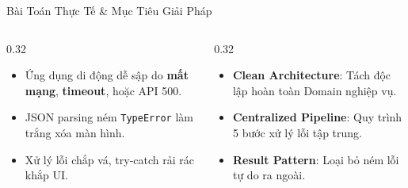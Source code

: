 \documentclass[aspectratio=169, 10pt]{beamer}
\newcommand{\speakerB}{\hfill\tcbox[colback=NavyPrimary,colframe=NavyPrimary,boxsep=1pt,left=3pt,right=3pt,top=1pt,bottom=1pt]{\tiny\bfseries\color{white}SV B: Phạm Nhung}}
\begin{document}
\begin{frame}{Bài Toán Thực Tế \& Mục Tiêu Giải Pháp \speakerB}
  \begin{columns}[T]
    \begin{column}{0.32\textwidth}
      \begin{tcolorbox}[colback=RoseDanger!5, colframe=RoseDanger, title=\textbf{1. Vấn đề thực tế}, arc=1.5mm, fonttitle=\scriptsize\bfseries]
        \begin{itemize}\setlength{\itemsep}{2pt}\scriptsize
          \item Ứng dụng di động dễ sập do \textbf{mất mạng}, \textbf{timeout}, hoặc API 500.
          \item JSON parsing ném \texttt{TypeError} làm trắng xóa màn hình.
          \item Xử lý lỗi chắp vá, try-catch rải rác khắp UI.
        \end{itemize}
      \end{tcolorbox}
    \end{column}

    \begin{column}{0.32\textwidth}
      \begin{tcolorbox}[colback=IndigoAccent!5, colframe=IndigoAccent, title=\textbf{2. Giải pháp kiến trúc}, arc=1.5mm, fonttitle=\scriptsize\bfseries]
        \begin{itemize}\setlength{\itemsep}{2pt}\scriptsize
          \item \textbf{Clean Architecture}: Tách độc lập hoàn toàn Domain nghiệp vụ.
          \item \textbf{Centralized Pipeline}: Quy trình 5 bước xử lý lỗi tập trung.
          \item \textbf{Result Pattern}: Loại bỏ ném lỗi tự do ra ngoài.
        \end{itemize}
      \end{tcolorbox}
    \end{column}


\end{columns}
\end{frame}
\end{document}
